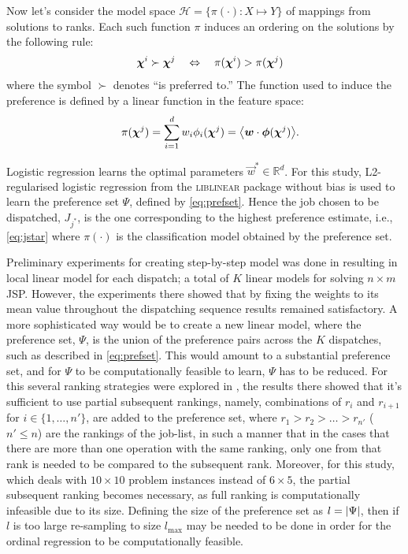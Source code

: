 \documentclass[twocolumn]{svjour3}
\begin{document}
Now let's consider the model space $\mathcal{H} = \{\pi(\cdot) : X \mapsto Y\}$ 
of mappings from solutions to ranks. Each such 
function $\pi$ induces an ordering on the solutions by the following rule:
\begin{equation}\quad\label{eq:linear}
\bm \chi^i \succ \bm \chi^j \quad \Leftrightarrow \quad \pi(\bm \chi^i) > 
\pi(\bm \chi^j)
\end{equation}
where the symbol $\succ$ denotes ``is preferred to.'' The function used to 
induce the preference is defined by a linear function in the feature space:
\begin{equation}\quad 
\pi(\vchi^j)=\sum_{i=1}^d w_i\phi_i(\vchi^j)=\inner{\vec{w}}{\vphi(\vchi^j)}.
\end{equation}

Logistic regression learns the optimal parameters $\vec{w}^*\in\mathbb{R}^d$. 
For this study, L2-regularised logistic regression from the \textsc{liblinear} 
package \cite{liblinear} without bias is used to learn the preference set 
$\Psi$, defined by \cref{eq:prefset}.
Hence the job chosen to be dispatched, $J_{j^*}$, is the one corresponding to 
the highest preference estimate, i.e., \cref{eq:jstar} where $\pi(\cdot)$ is 
the classification model obtained by the preference set.

Preliminary experiments for creating step-by-step model was done in 
\cite{InRu11a} resulting in local linear model for each dispatch; a total of 
$K$ linear models for solving $n\times m$ JSP. 
However, the experiments there showed that by fixing the weights to its mean 
value throughout the dispatching sequence results remained satisfactory.
A more sophisticated way would be to create a new linear model, where 
the preference set, $\Psi$, is the union of the preference pairs across the 
$K$ dispatches, such as described in \cref{eq:prefset}. 
This would amount to a substantial preference set, and for $\Psi$ to be 
computationally feasible to learn, $\Psi$ has to be reduced. For this several 
ranking strategies were explored in \cite{InRu15a}, the results there showed 
that it's sufficient to use partial subsequent rankings, namely, combinations 
of $r_i$ and $r_{i+1}$ for $i\in\{1,\ldots,n'\}$, are added to the preference 
set, where $r_1>r_2>\ldots>r_{n'}$ ($n'\leq n$) are the rankings of the 
job-list, in such a manner that in the cases that there are more than one 
operation with the same ranking, only one from that rank is needed to be 
compared to the subsequent rank. 
Moreover, for this study, which deals with $10\times 10$ problem instances 
instead of $6\times5$, the partial subsequent ranking becomes necessary, as 
full ranking is computationally infeasible due to its size. 
Defining the size of the preference set as $l=\lvert\Psi\rvert$, then if $l$ is too 
large re-sampling to size $l_{\max}$ may be needed to be done in order for the 
ordinal regression to be computationally feasible. 
\end{document}
